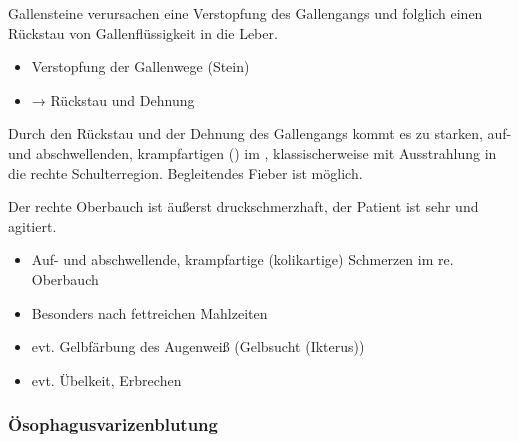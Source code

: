 

{Gallensteine verursachen eine Verstopfung des
Gallengangs und folglich einen Rückstau von
Gallenflüssigkeit in die Leber.
} 
{
\begin{itemize}
  \item Verstopfung der Gallenwege (Stein)
  \item → Rückstau und Dehnung
\end{itemize}
}{}{}{}

{
Durch den Rückstau und der Dehnung des Gallengangs kommt es zu
starken, auf- und abschwellenden, krampfartigen
()  im ,
klassischerweise mit Ausstrahlung in die rechte Schulterregion. Begleitendes Fieber ist möglich.

Der rechte Oberbauch ist äußerst druckschmerzhaft, der
Patient ist sehr  und agitiert.
}{
\begin{itemize}
  \item Auf- und abschwellende, krampfartige
  (kolikartige) Schmerzen im re. Oberbauch
  \item Besonders nach fettreichen Mahlzeiten
  \item evt. Gelbfärbung des Augenweiß (Gelbsucht (Ikterus))
  \item evt. Übelkeit, Erbrechen
\end{itemize}
}{}{}{}



\subsubsection{Ösophagusvarizenblutung}

\nopagebreak[4]

